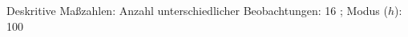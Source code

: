 				\label{tableValues:mres052e_g2d}
				\vspace*{-\baselineskip}
                    \begin{noten}
                	    \note{} Deskritive Maßzahlen:
                	    Anzahl unterschiedlicher Beobachtungen: 16%
                	    ; 
                	      Modus ($h$): 100
                     \end{noten}


